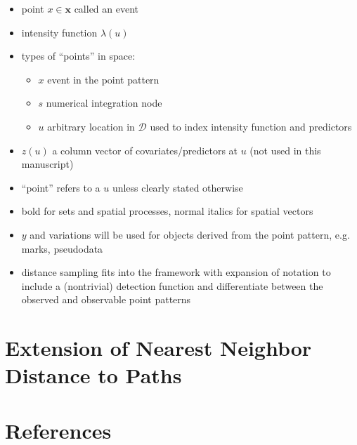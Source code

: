 \documentclass[review]{elsarticle}
\begin{document}
\begin{itemize}
\item point \(x \in \mathbf{x}\) called an event

\item intensity function \(\lambda(u)\)

\item types of ``points'' in space:
\begin{itemize}
\item \(x\) event in the point pattern
\item \(s\) numerical integration node
\item \(u\) arbitrary location in \(\mathcal{D}\) used to index intensity
function and predictors
\end{itemize}

\item \(z(u)\) a column vector of covariates/predictors at \(u\) (not used in
this manuscript)

\item ``point'' refers to a \(u\) unless clearly stated otherwise

\item bold for sets and spatial processes, normal italics for spatial vectors

\item \(y\) and variations will be used for objects derived from the point
pattern, e.g. marks, pseudodata

\item distance sampling fits into the framework with expansion of notation
to include a (nontrivial) detection function and differentiate between the
observed and observable point patterns

\end{itemize}


\section{Extension of Nearest Neighbor Distance to Paths}


\section*{References}


\end{document}
